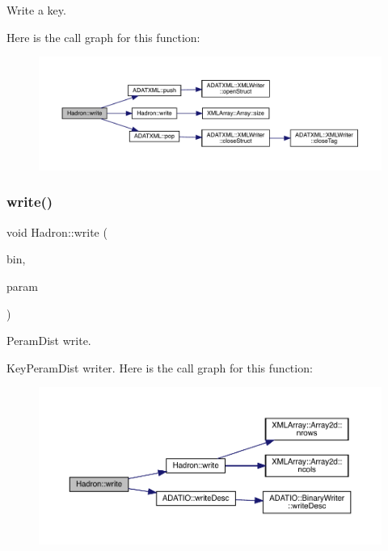 Write a key. 

Here is the call graph for this function\+:
\nopagebreak
\begin{figure}[H]
\begin{center}
\leavevmode
\includegraphics[width=350pt]{d1/daf/namespaceHadron_a4ae7852bf18d56cb1a966ce318245ea6_cgraph}
\end{center}
\end{figure}
\mbox{\label{namespaceHadron_a1f7e7b8c782fddd330a9f4491bd37e22}} 
\subsubsection{\texorpdfstring{write()}{write()}\hspace{0.1cm}{\footnotesize\ttfamily [26/95]}}
{\footnotesize\ttfamily void Hadron\+::write (\begin{DoxyParamCaption}\item[{\mbox{\hyperlink{classADATIO_1_1BinaryWriter}{Binary\+Writer}} \&}]{bin,  }\item[{const \mbox{\hyperlink{structHadron_1_1KeyPeramDist__t}{Key\+Peram\+Dist\+\_\+t}} \&}]{param }\end{DoxyParamCaption})}



Peram\+Dist write. 

Key\+Peram\+Dist writer. Here is the call graph for this function\+:
\nopagebreak
\begin{figure}[H]
\begin{center}
\leavevmode
\includegraphics[width=350pt]{d1/daf/namespaceHadron_a1f7e7b8c782fddd330a9f4491bd37e22_cgraph}
\end{center}
\end{figure}
\mbox{\label{namespaceHadron_a536d0c7d1bd20e64ba84b0588b3696f9}} 
